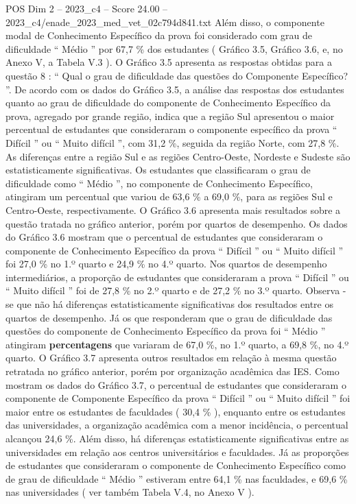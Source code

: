 \begin{textsample}{POS Dim 2 – 2023\_c4 – Score 24.00 – 2023\_c4/enade\_2023\_med\_vet\_02c794d841.txt}
Além disso, o componente modal de Conhecimento Específico da prova foi considerado com grau de dificuldade “ Médio ” por 67,7 \% dos estudantes ( Gráfico 3.5, Gráfico 3.6, e, no Anexo V, a Tabela V.3 ).
O Gráfico 3.5 apresenta as respostas obtidas para a questão 8 : “ Qual o grau de dificuldade das questões do Componente Específico? ”.
De acordo com os dados do Gráfico 3.5, a análise das respostas dos estudantes quanto ao grau de dificuldade do componente de Conhecimento Específico da prova, agregado por grande região, indica que a região Sul apresentou o maior percentual de estudantes que consideraram o componente específico da prova “ Difícil ” ou “ Muito difícil ”, com 31,2 \%, seguida da região Norte, com 27,8 \%.
As diferenças entre a região Sul e as regiões Centro-Oeste, Nordeste e Sudeste são estatisticamente significativas.
Os estudantes que classificaram o grau de dificuldade como “ Médio ”, no componente de Conhecimento Específico, atingiram um percentual que variou de 63,6 \% a 69,0 \%, para as regiões Sul e Centro-Oeste, respectivamente.
O Gráfico 3.6 apresenta mais resultados sobre a questão tratada no gráfico anterior, porém por quartos de desempenho.
Os dados do Gráfico 3.6 mostram que o percentual de estudantes que consideraram o componente de Conhecimento Específico da prova “ Difícil ” ou “ Muito difícil ” foi 27,0 \% no 1.º quarto e 24,9 \% no 4.º quarto.
Nos quartos de desempenho intermediários, a proporção de estudantes que consideraram a prova “ Difícil ” ou “ Muito difícil ” foi de 27,8 \% no 2.º quarto e de 27,2 \% no 3.º quarto.
Observa -se que não há diferenças estatisticamente significativas dos resultados entre os quartos de desempenho.
Já os que responderam que o grau de dificuldade das questões do componente de Conhecimento Específico da prova foi “ Médio ” atingiram \textbf{percentagens} que variaram de 67,0 \%, no 1.º quarto, a 69,8 \%, no 4.º quarto.
O Gráfico 3.7 apresenta outros resultados em relação à mesma questão retratada no gráfico anterior, porém por organização acadêmica das IES.
Como mostram os dados do Gráfico 3.7, o percentual de estudantes que consideraram o componente de Componente Específico da prova “ Difícil ” ou “ Muito difícil ” foi maior entre os estudantes de faculdades ( 30,4 \% ), enquanto entre os estudantes das universidades, a organização acadêmica com a menor incidência, o percentual alcançou 24,6 \%.
Além disso, há diferenças estatisticamente significativas entre as universidades em relação aos centros universitários e faculdades.
Já as proporções de estudantes que consideraram o componente de Conhecimento Específico como de grau de dificuldade “ Médio ” estiveram entre 64,1 \% nas faculdades, e 69,6 \% nas universidades ( ver também Tabela V.4, no Anexo V ).

\end{textsample}
